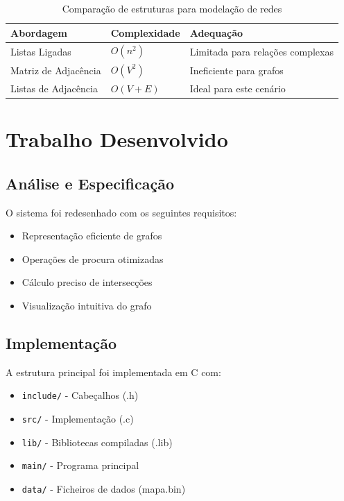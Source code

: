 \documentclass[a4paper,12pt]{report}
\begin{document}
\begin{table}[H]
\centering
\begin{tabular}{lll}
\toprule
\textbf{Abordagem} & \textbf{Complexidade} & \textbf{Adequação} \\
\midrule
Listas Ligadas & \(O(n^2)\) & Limitada para relações complexas \\
Matriz de Adjacência & \(O(V^2)\) & Ineficiente para grafos \\
Listas de Adjacência & \(O(V+E)\) & Ideal para este cenário \\
\bottomrule
\end{tabular}
\caption{Comparação de estruturas para modelação de redes}
\label{tab:comparativo_grafos}
\end{table}

\chapter{Trabalho Desenvolvido}
\section{Análise e Especificação}
O sistema foi redesenhado com os seguintes requisitos:

\begin{itemize}
    \item Representação eficiente de grafos
    \item Operações de procura otimizadas
    \item Cálculo preciso de intersecções
    \item Visualização intuitiva do grafo
\end{itemize}

\section{Implementação}
A estrutura principal foi implementada em C com:

\begin{itemize}
    \item \texttt{include/} - Cabeçalhos (.h)
    \item \texttt{src/} - Implementação (.c) 
    \item \texttt{lib/} - Bibliotecas compiladas (.lib)
    \item \texttt{main/} - Programa principal
    \item \texttt{data/} - Ficheiros de dados (mapa.bin)
\end{itemize}
\end{document}
